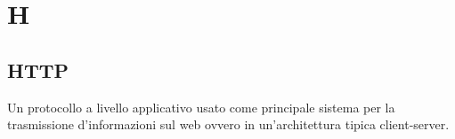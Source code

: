 \section{H}
	\subsection{HTTP}
		Un protocollo a livello applicativo usato come principale sistema per la trasmissione d'informazioni sul web ovvero in un'architettura tipica client-server.